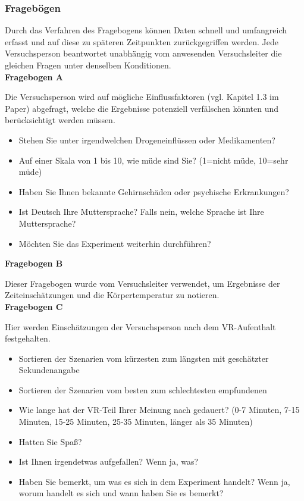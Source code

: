 \documentclass{Bericht}
\begin{document}
\subsubsection{Fragebögen}
Durch das Verfahren des Fragebogens können Daten schnell und umfangreich erfasst und auf diese zu späteren Zeitpunkten zurückgegriffen werden. Jede Versuchsperson beantwortet unabhängig vom anwesenden Versuchsleiter die gleichen Fragen unter denselben Konditionen.\\
\newpage
\label{subsec:fragebogen}
\textbf{Fragebogen A}

Die Versuchsperson wird auf mögliche Einflussfaktoren (vgl. Kapitel 1.3 im Paper) abgefragt, welche die Ergebnisse potenziell verfälschen könnten und berücksichtigt werden müssen.
\begin{itemize}
	\setlength{\itemsep}{0em}
	\item Stehen Sie unter irgendwelchen Drogeneinflüssen oder Medikamenten?
	\item Auf einer Skala von 1 bis 10, wie müde sind Sie? (1=nicht müde, 10=sehr müde)
	\item Haben Sie Ihnen bekannte Gehirnschäden oder psychische Erkrankungen?
	\item Ist Deutsch Ihre Muttersprache? Falls nein, welche Sprache ist Ihre Muttersprache?
	\item Möchten Sie das Experiment weiterhin durchführen?
\end{itemize}

\textbf{Fragebogen B}

Dieser Fragebogen wurde vom Versuchsleiter verwendet, um Ergebnisse der Zeiteinschätzungen und die Körpertemperatur zu notieren.\\


\textbf{Fragebogen C}

Hier werden Einschätzungen der Versuchsperson nach dem VR-Aufenthalt festgehalten.

\begin{itemize}
	\setlength{\itemsep}{0em}
	\item Sortieren der Szenarien vom kürzesten zum längsten mit geschätzter Sekundenangabe
	\item Sortieren der Szenarien vom besten zum schlechtesten empfundenen
	\item Wie lange hat der VR-Teil Ihrer Meinung nach gedauert? (0-7 Minuten, 7-15 Minuten, 15-25 Minuten, 25-35 Minuten, länger als 35 Minuten)
	\item Hatten Sie Spaß?
	\item Ist Ihnen irgendetwas aufgefallen? Wenn ja, was?
	\item Haben Sie bemerkt, um was es sich in dem Experiment handelt? Wenn ja, worum handelt es sich und wann haben Sie es bemerkt?
\end{itemize}
\end{document}
